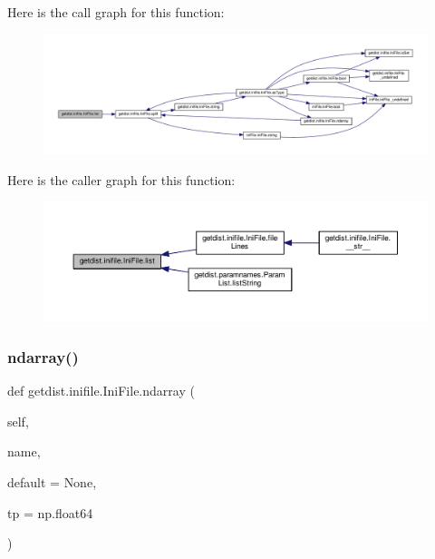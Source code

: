 Here is the call graph for this function\+:
\nopagebreak
\begin{figure}[H]
\begin{center}
\leavevmode
\includegraphics[width=350pt]{classgetdist_1_1inifile_1_1IniFile_ab16c07aad361f648bc04bd646ccabc68_cgraph}
\end{center}
\end{figure}
Here is the caller graph for this function\+:
\nopagebreak
\begin{figure}[H]
\begin{center}
\leavevmode
\includegraphics[width=350pt]{classgetdist_1_1inifile_1_1IniFile_ab16c07aad361f648bc04bd646ccabc68_icgraph}
\end{center}
\end{figure}
\mbox{\label{classgetdist_1_1inifile_1_1IniFile_a18e5f6bbc80b9ab0b7e9ebeff9eff3ec}} 
\subsubsection{\texorpdfstring{ndarray()}{ndarray()}}
{\footnotesize\ttfamily def getdist.\+inifile.\+Ini\+File.\+ndarray (\begin{DoxyParamCaption}\item[{}]{self,  }\item[{}]{name,  }\item[{}]{default = {\ttfamily None},  }\item[{}]{tp = {\ttfamily np.float64} }\end{DoxyParamCaption})}

